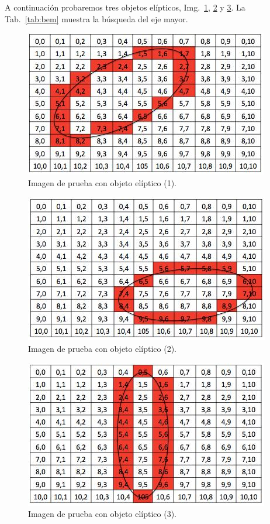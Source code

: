 A continuación probaremos tres objetos elípticos, Img.~\ref{img:ipoe1}, \ref{img:ipoe2} y \ref{img:ipoe3}. La Tab.~\ref{tab:bem} muestra la búsqueda del eje mayor.

\begin{figure}[ht!]
	\centering
	\includegraphics[scale=.5]{img/ipoe1}
	\caption{Imagen de prueba con objeto elíptico (1).}
	\label{img:ipoe1}
\end{figure}

\begin{figure}[ht!]
	\centering
	\includegraphics[scale=.5]{img/ipoe2}
	\caption{Imagen de prueba con objeto elíptico (2).}
	\label{img:ipoe2}
\end{figure}

\begin{figure}[ht!]
	\centering
	\includegraphics[scale=.5]{img/ipoe3}
	\caption{Imagen de prueba con objeto elíptico (3).}
	\label{img:ipoe3}
\end{figure}

